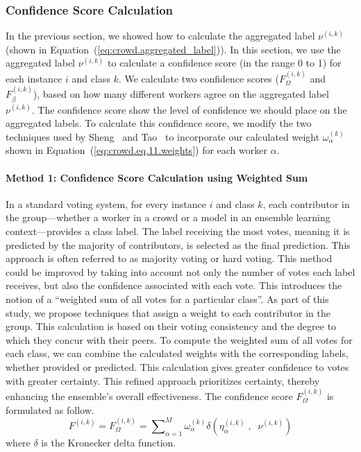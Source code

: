 \documentclass[sn-nature]{bst/sn-jnl}
\begin{document}
\subsubsection{Confidence Score Calculation}
In the previous section, we showed how to calculate the aggregated label $\nu^{(i,k)}$ (shown in Equation~(\ref{eq:crowd.aggregated_label})). In this section, we use the aggregated label $\nu^{(i,k)}$ to calculate a confidence score (in the range 0 to 1) for each instance $i $ and class $k $. We calculate two confidence scores ($F_{\Omega}^{(i,k)} $ and $F_{\beta}^{(i,k)} $), based on how many different workers agree on the aggregated label $\nu^{(i,k)}$. The confidence score show the level of confidence we should place on the aggregated labels. To calculate this confidence score, we modify the two techniques used by Sheng~\cite{sheng_Majority_2019} and Tao~\cite{tao_Label_2020} to incorporate our calculated weight $\omega_{\alpha}^{(k)} $ shown in Equation~(\ref{eq:crowd.eq.11.weights})  for each worker $\alpha $.

\paragraph*{Method 1: Confidence Score Calculation using Weighted Sum}
In a standard voting system, for every instance $i$ and class $k$, each contributor in the group—whether a worker in a crowd or a model in an ensemble learning context—provides a class label. The label receiving the most votes, meaning it is predicted by the majority of contributors, is selected as the final prediction. This approach is often referred to as majority voting or hard voting.
This method could be improved by taking into account not only the number of votes each label receives, but also the confidence associated with each vote. This introduces the notion of a ``weighted sum of all votes for a particular class''. As part of this study, we propose techniques that assign a weight to each contributor in the group. This calculation is based on their voting consistency and the degree to which they concur with their peers.
To compute the weighted sum of all votes for each class, we can combine the calculated weights with the corresponding labels, whether provided or predicted. This calculation gives greater confidence to votes with greater certainty. This refined approach prioritizes certainty, thereby enhancing the ensemble's overall effectiveness.
The confidence score $F_{\Omega}^{(i,k)}$ is formulated as follow.
\begin{equation}
    F^{(i,k)} = F_{\Omega}^{(i,k)} = {\sum\nolimits_{\alpha=1}^{M}{\omega_{\alpha}^{(k)} \delta\left(\eta_{\alpha}^{(i,k)} \;,\;\; \nu^{(i,k)} \right)}}
    \label{eq:crowd.Eq.13.confidence-score.Freq}
\end{equation}
where $\delta $ is the Kronecker delta function.
\end{document}
